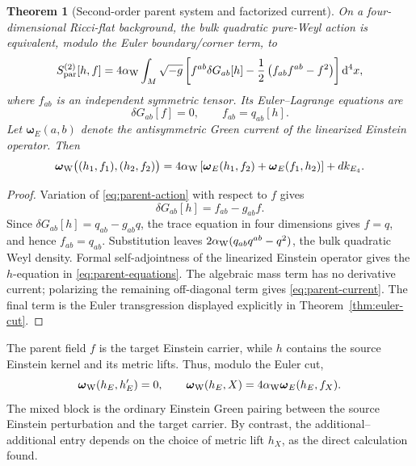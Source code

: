 \documentclass[11pt]{article}
\newtheorem{theorem}{Theorem}[section]
\theoremstyle{definition}
\theoremstyle{remark}
\newcommand{\dd}{\mathrm d}
\begin{document}
\begin{theorem}[Second-order parent system and factorized current]
\label{thm:parent-system}
On a four-dimensional Ricci-flat background, the bulk quadratic pure-Weyl
action is equivalent, modulo the Euler boundary/corner term, to
\begin{equation}
\label{eq:parent-action}
S_{\rm par}^{(2)}[h,f]
=
4\alpha_{\rm W}\int_M\sqrt{-g}\left[
f^{ab}\delta G_{ab}[h]
-\frac12\left(f_{ab}f^{ab}-f^2\right)
\right]\dd^4x ,
\end{equation}
where \(f_{ab}\) is an independent symmetric tensor.  Its Euler--Lagrange
equations are
\begin{equation}
\label{eq:parent-equations}
\delta G_{ab}[f]=0,
\qquad
f_{ab}=q_{ab}[h].
\end{equation}
Let \(\boldsymbol\omega_E(a,b)\) denote the antisymmetric Green current of
the linearized Einstein operator.  Then
\begin{equation}
\label{eq:parent-current}
\boldsymbol\omega_{\rm W}\big((h_1,f_1),(h_2,f_2)\big)
=
4\alpha_{\rm W}\left[
\boldsymbol\omega_E(h_1,f_2)
+\boldsymbol\omega_E(f_1,h_2)
\right]
+d k_{E_4}.
\end{equation}
\end{theorem}

\begin{proof}
Variation of \eqref{eq:parent-action} with respect to \(f\) gives
\[
\delta G_{ab}[h]=f_{ab}-g_{ab}f.
\]
Since \(\delta G_{ab}[h]=q_{ab}-g_{ab}q\), the trace equation in four
dimensions gives \(f=q\), and hence \(f_{ab}=q_{ab}\).  Substitution leaves
\(2\alpha_{\rm W}(q_{ab}q^{ab}-q^2)\), the bulk quadratic Weyl density.
Formal self-adjointness of the linearized Einstein operator gives the
\(h\)-equation in \eqref{eq:parent-equations}.  The algebraic mass term has
no derivative current; polarizing the remaining off-diagonal term gives
\eqref{eq:parent-current}.  The final term is the Euler transgression
displayed explicitly in Theorem~\ref{thm:euler-cut}.
\end{proof}

The parent field \(f\) is the target Einstein carrier, while \(h\) contains
the source Einstein kernel and its metric lifts.  Thus, modulo the Euler cut,
\[
\boldsymbol\omega_{\rm W}(h_E,h'_E)=0,
\qquad
\boldsymbol\omega_{\rm W}(h_E,X)
=4\alpha_{\rm W}\boldsymbol\omega_E(h_E,f_X).
\]
The mixed block is the ordinary Einstein Green pairing between the source
Einstein perturbation and the target carrier.  By contrast, the
additional--additional entry depends on the choice of metric lift \(h_X\),
as the direct calculation found.
\end{document}
